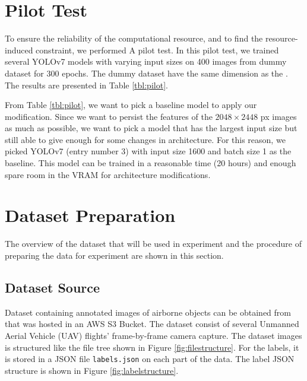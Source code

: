 \section{Pilot Test}
To ensure the reliability of the computational resource, and to find the resource-induced constraint, we performed A
pilot test.
In this pilot test, we trained several YOLOv7 models with varying input sizes on 400 images from dummy dataset for 300 epochs.
The dummy dataset have the same dimension as the \textcite{aot_dataset}.
The results are presented in Table \ref{tbl:pilot}. 
\begin{table}[b]
  \centering
  \label{tbl:pilot}
  \vspace{-1ex}
  \begin{adjustbox}{width=\textwidth}
    
  \end{adjustbox}
\end{table}

From Table \ref{tbl:pilot}, we want to pick a baseline model to apply our modification.
Since we want to persist the features of the $2048\times 2448$ px images as much as possible, 
we want to pick a model that has the largest input size but still able to give enough for some 
changes in architecture. 
For this reason, we picked YOLOv7 (entry number 3) with input size 1600 and batch size 1 as the baseline.
This model can be trained in a reasonable time (20 hours) and enough spare room in the VRAM for architecture modifications.


\section{Dataset Preparation}
\label{section:dataset}
The overview of the dataset that will be used in experiment and the procedure of preparing the data for experiment are shown in this section.

  \subsection{Dataset Source}
  \label{section:datasetsource}
  Dataset containing annotated images of airborne objects can be obtained from \textcite{aot_dataset}
  that was hosted in an AWS S3 Bucket.
  The dataset consist of several Unmanned Aerial Vehicle (UAV) flights' frame-by-frame camera capture.
  The dataset images is structured like the file tree shown in Figure \ref{fig:filestructure}.
  For the labels, it is stored in a JSON file
 \verb|labels.json| on each part of the data. The label JSON structure is shown in Figure \ref{fig:labelstructure}.

